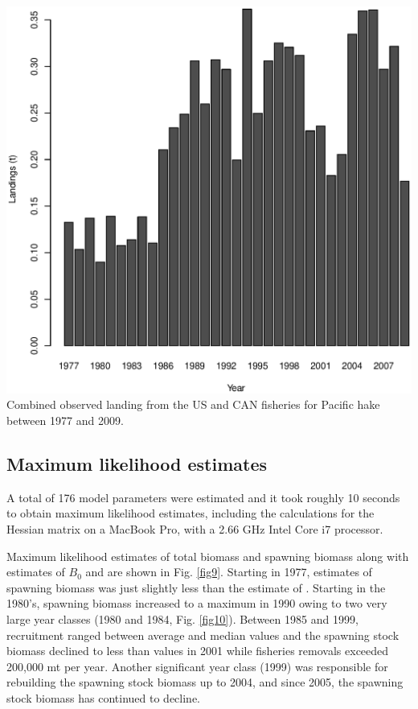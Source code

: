 \begin{multicols}{2}
\begin{figurehere}
	\centering
	\includegraphics[width=0.8\columnwidth]{iscamFigs/phakefig15.eps}\\
	\caption{Combined observed landing from the US and CAN fisheries for Pacific hake between 1977 and 2009.}\label{fig8}
\end{figurehere}
%


\subsection{Maximum likelihood estimates}
A total of 176 model parameters were estimated and it took  roughly 10 seconds to obtain maximum likelihood estimates, including the calculations for the Hessian matrix on a MacBook Pro, with a 2.66 GHz Intel Core i7 processor.

Maximum likelihood estimates of total biomass and spawning biomass along with estimates of $B_0$ and \bmsy are shown in Fig. \ref{fig9}.  Starting in 1977, estimates of spawning biomass was just slightly less than the estimate of \bmsy.  Starting in the 1980's, spawning biomass increased to a maximum in 1990 owing to two very large year classes (1980 and 1984, Fig. \ref{fig10}). Between 1985 and 1999, recruitment ranged between average and median values and the spawning stock biomass declined to less than \bmsy values in 2001 while fisheries removals exceeded 200,000 mt per year.  Another significant year class (1999) was responsible for rebuilding the spawning stock biomass up to 2004, and since 2005, the spawning stock biomass has continued to decline.


\end{multicols}
